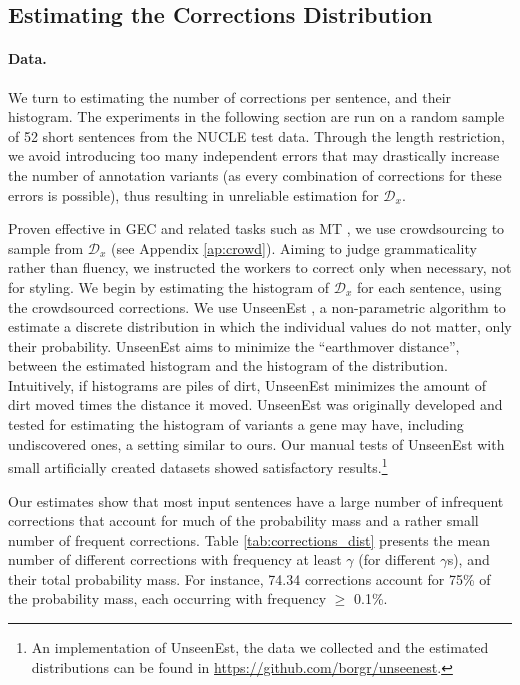 \documentclass[a4paper]{article}
\begin{document}
\subsection{Estimating the Corrections Distribution}\label{subsec:corrections_distribution}
%
\paragraph{Data.}
We turn to estimating the number of corrections per sentence, and their histogram.
The experiments in the following section are run on a random sample of 52 short sentences from the NUCLE test data. Through the length restriction, we avoid introducing too many independent errors that may drastically increase the number of annotation variants (as every combination of corrections for these errors is possible), thus resulting in unreliable estimation for $\mathcal{D}_x$. 

Proven effective in GEC and related tasks such as MT \cite{zaidan2011crowdsourcing,madnani2011they,post2012constructing}, 
we use crowdsourcing to sample from $\mathcal{D}_x$ (see Appendix  \ref{ap:crowd}).
Aiming to judge grammaticality rather than fluency, we instructed the workers to correct only when necessary, not for styling.
We begin by estimating the histogram of $\mathcal{D}_x$ for each sentence, using the crowdsourced corrections.
We use {\sc UnseenEst} \cite{zou2015quantifying}, a non-parametric algorithm to
estimate a discrete distribution in which the individual values do not matter, only their probability. 
{\sc UnseenEst} aims to minimize the ``earthmover distance'', between the estimated histogram and the histogram of the distribution. 
Intuitively, if histograms are piles of dirt, {\sc UnseenEst} minimizes the amount of dirt moved times the distance it moved.
{\sc UnseenEst} was originally developed and tested for estimating the histogram of
variants a gene may have, including undiscovered ones, a setting similar to ours.
Our manual tests of {\sc UnseenEst} with small artificially created datasets
showed satisfactory results.\footnote{An implementation of {\sc UnseenEst}, the data we collected and the estimated
distributions can be found in \url{https://github.com/borgr/unseenest}.}

Our estimates show that most input sentences have a large number of
infrequent corrections that account for much of the probability mass
and a rather small number of frequent corrections.
Table \ref{tab:corrections_dist} presents the mean number of different corrections with frequency at least $\gamma$ (for different $\gamma$s), and their total probability mass.
For instance, 74.34 corrections account for 75\% of the probability mass, each occurring with frequency $\geq$ 0.1\%.
\end{document}
